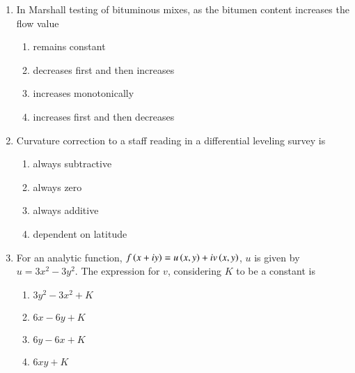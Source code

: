 \documentclass[journal,onecolumn]{IEEEtran}
\theoremstyle{remark}
\begin{document}
\begin{enumerate}
    \item In Marshall testing of bituminous mixes, as the bitumen content increases the flow value

	\begin{enumerate}
		\item remains constant
		\item decreases first and then increases
		\item increases monotonically
		\item increases first and then decreases
	\end{enumerate}


    \item Curvature correction to a staff reading in a differential leveling survey is

	\begin{enumerate}
		\item always subtractive
		\item always zero 
		\item always additive
		\item dependent on latitude
	\end{enumerate}

    \item For an analytic function, $f\left(x + iy\right) = u\left(x, y\right) + iv\left(x, y\right)$, $u$ is given by $u = 3x^2 - 3y^2$. The expression for $v$, considering $K$ to be a constant is

	\begin{enumerate}
		\item $3y^2 - 3x^2 + K$
		\item $6x- 6y + K$
		\item $6y - 6x + K$
		\item $6xy + K$
	\end{enumerate}


\end{enumerate}
\end{document}
